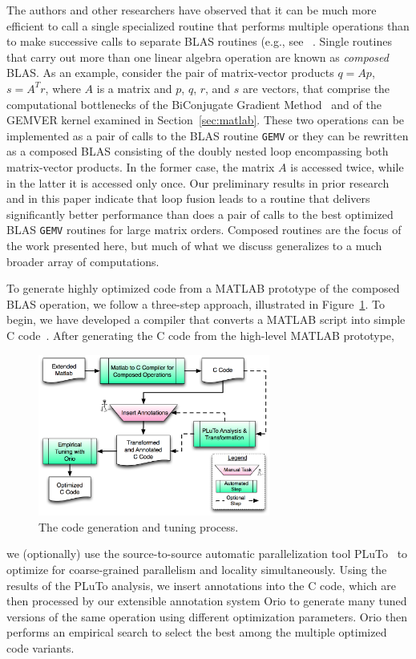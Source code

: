 \documentclass[runningheads]{llncs}
\begin{document}
The authors and other researchers have observed that it can be much more
efficient to call a single specialized routine that performs multiple
operations than to make successive calls to separate BLAS routines (e.g., see
~\cite{gropp01,Vuduc:2003kl}.
Single routines that carry out more than one linear algebra operation are
known as \emph{composed} BLAS. As an example, consider the pair of
matrix-vector products $q = Ap$, $s = A^Tr$, where $A$ is a matrix and $p$,
$q$, $r$, and $s$ are vectors, that comprise the computational bottlenecks of
the BiConjugate Gradient Method~\cite{Barrett:1994kx,Saad:2003fk} and of the
GEMVER kernel examined in Section~\ref{sec:matlab}.  These two operations can
be implemented as a pair of calls to the BLAS routine {\tt GEMV} or they can
be rewritten as a composed BLAS consisting of the doubly nested loop
encompassing both matrix-vector products. In the former case, the matrix
$A$ is accessed twice, while in the latter it is accessed only once. Our
preliminary results in prior research and in this paper indicate that 
loop fusion leads to a routine that delivers significantly better performance
than does a pair of calls to the best optimized BLAS {\tt GEMV} routines for
large matrix orders.  Composed routines are the focus of the work presented
here, but much of what we discuss generalizes to a much broader array of
computations.

To generate highly optimized code from a MATLAB prototype of the composed BLAS operation, we follow a three-step approach, illustrated in Figure~\ref{fig:process}.  To begin,
we have developed a compiler that converts a MATLAB script into simple C code~\cite{Siek}.
After generating the C code from the high-level MATLAB prototype, 
%
\begin{figure}
\vspace{-.2in}
\centering
\includegraphics[width=3in]{figures/process.png}
\caption{The code generation and tuning process.}
\label{fig:process}
\vspace{-.2in}
\end{figure}
%
we (optionally) use the source-to-source automatic parallelization tool PLuTo~\cite{Pluto} %
to optimize for coarse-grained parallelism and locality simultaneously. Using
the results of the PLuTo analysis, we insert annotations into the C code,
which are then processed by our extensible annotation system Orio to generate
many tuned versions of the same operation using different optimization
parameters. Orio then performs an empirical search to select the best among
the multiple optimized code variants.
\end{document}
